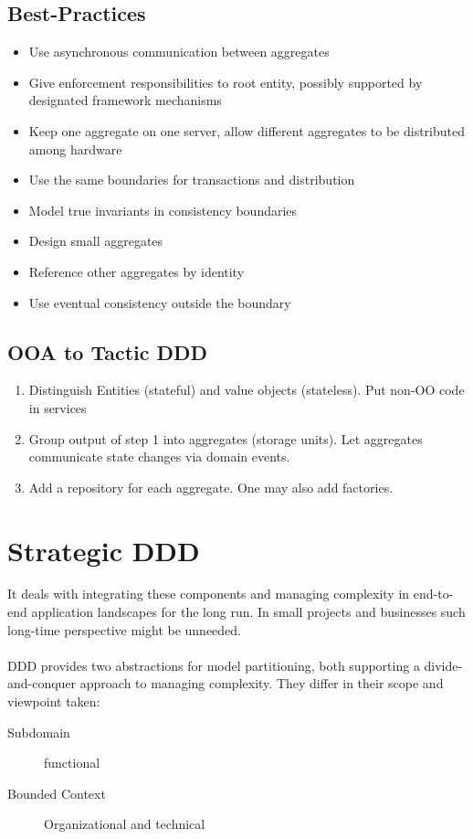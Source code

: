 \documentclass[../Main.tex]{subfiles}
\begin{document}
\subsection{Best-Practices}
\begin{itemize}
    \item Use asynchronous communication between aggregates
    \item Give enforcement responsibilities to root entity, possibly supported by designated framework mechanisms
    \item Keep one aggregate on one server, allow different aggregates to be distributed among hardware
    \item Use the same boundaries for transactions and distribution
    \item Model true invariants in consistency boundaries
    \item Design small aggregates
    \item Reference other aggregates by identity
    \item Use eventual consistency outside the boundary
\end{itemize}

\newpage

\subsection{OOA to Tactic DDD}
\begin{enumerate}
    \item Distinguish Entities (stateful) and value objects (stateless). Put non-OO code in services
    \item Group output of step 1 into aggregates (storage units). Let aggregates communicate state changes via domain events.
    \item Add a repository for each aggregate. One may also add factories.
\end{enumerate}
\newpage

\section{Strategic DDD}

It deals with integrating these components and managing complexity in end-to-end application landscapes for the long run.
In small projects and businesses such long-time perspective might be unneeded.
\\\\
DDD provides two abstractions for model partitioning, both supporting a divide-and-conquer approach to managing complexity.
They differ in their scope and viewpoint taken:
\begin{description}
    \item[Subdomain] functional
    \item[Bounded Context] Organizational and technical  
\end{description}
\end{document}
